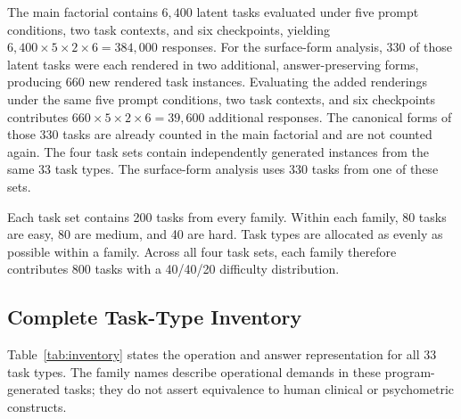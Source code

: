 \documentclass[sigconf,anonymous,review]{acmart}
\begin{document}
The main factorial contains $6{,}400$ latent tasks evaluated under five prompt
conditions, two task contexts, and six checkpoints, yielding
$6{,}400\times5\times2\times6=384{,}000$ responses. For the surface-form
analysis, 330 of those latent tasks were each rendered in two additional,
answer-preserving forms, producing 660 new rendered task instances. Evaluating
the added renderings under the same five prompt conditions, two task contexts,
and six checkpoints contributes
$660\times5\times2\times6=39{,}600$ additional responses. The canonical forms
of those 330 tasks are already counted in the main factorial and are not
counted again. The four task sets contain independently generated instances
from the same 33 task types. The surface-form analysis uses 330 tasks from one
of these sets.

Each task set contains 200 tasks from every family. Within each family, 80
tasks are easy, 80 are medium, and 40 are hard. Task types are allocated as
evenly as possible within a family. Across all four task sets, each family
therefore contributes 800 tasks with a 40/40/20 difficulty distribution.

\subsection{Complete Task-Type Inventory}

Table~\ref{tab:inventory} states the operation and answer representation for
all 33 task types. The family names describe operational demands in these
program-generated tasks; they do not assert equivalence to human clinical or
psychometric constructs.
\end{document}
